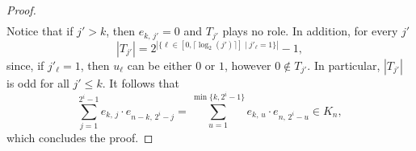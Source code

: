 \documentclass[11pt]{article}
\newcommand{\es}[2]{e_{#1,\, #2}}
\theoremstyle{plain}
\theoremstyle{definition}
\theoremstyle{remark}
\begin{document}
\begin{proof}
\begin{align*}
    \end{align*}
    Notice that if $j'>k$, then $\es{k}{j'}=0$ and $T_{j'}$ plays no role.   
    In addition, for every $j'$
    \begin{equation*}
        |T_{j'}|=2^{|\{\ell\in[0,\lceil\operatorname{log}_2(j')\rceil]\mid j'_\ell =1\}|}-1,
    \end{equation*}
    since, if $j'_\ell =1$, then $u_\ell$ can be either $0$ or $1$, however $0\not\in T_{j'}$. In particular, $|T_{j'}|$ is odd for all $j'\leq k$. It follows that $$\sum\limits_{j=1}^{2^i-1}\es{k}{j}\cdot\es{n-k}{2^i-j}=\sum\limits_{u=1}^{\min\{k,2^i-1\}}\es{k}{u}\cdot\es{n}{2^i-u}\in K_n,$$  
    which concludes the proof.

\end{proof}
\end{document}
